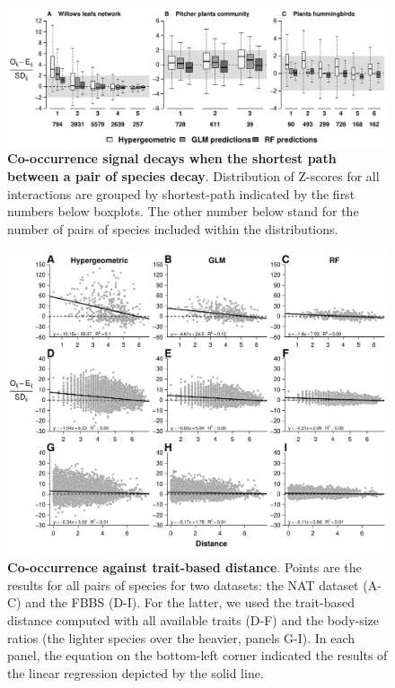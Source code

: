 \begin{figure}[htbp]
\centering
\includegraphics[width=\textwidth]{chapitre3/figS5.pdf}
\caption[Co-occurrence signal decays when the shortest path
between a pair of species decay]{\textbf{Co-occurrence signal decays when the shortest path
between a pair of species decay}. Distribution of Z-scores for all
interactions are grouped by shortest-path indicated by the first numbers
below boxplots. The other number below stand for the number of pairs of
species included within the distributions.\label{fig:sht_pth2}}
\end{figure}

\newpage

\begin{figure}[htbp]
\centering
\includegraphics[width=\textwidth]{chapitre3/figS6.pdf}
\caption[Co-occurrence against trait-based distance]{
\textbf{Co-occurrence against trait-based distance}. Points
are the results for all pairs of species for two datasets:
the NAT dataset (A-C) and the FBBS (D-I). For the latter, we used the trait-based distance
computed with all available traits (D-F) and the body-size ratios (the
lighter species over the heavier, panels G-I). In each panel, the
equation on the bottom-left corner indicated the results of the linear
regression depicted by the solid line.\label{fig:distrev}}
\end{figure}

